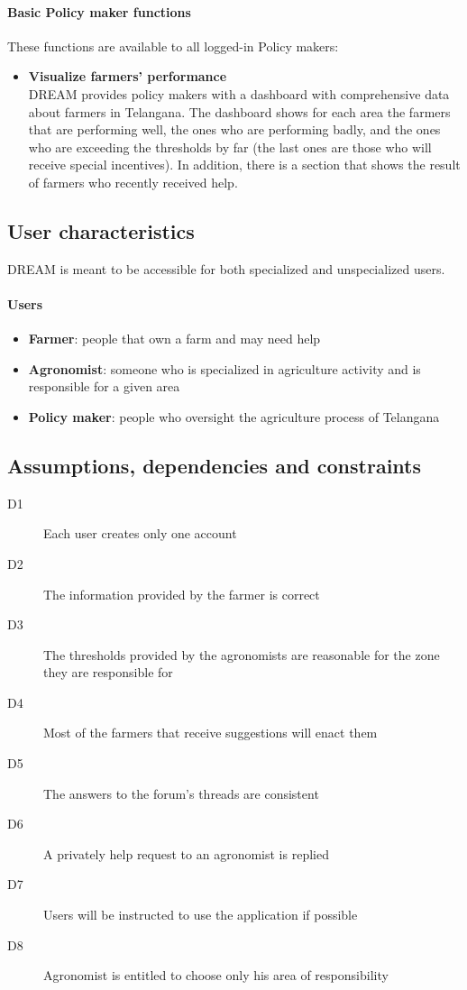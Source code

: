 \paragraph{Basic Policy maker functions} These functions are available to all logged-in Policy makers:
\begin{itemize}
    \item \textbf{Visualize farmers' performance}\\
    DREAM provides policy makers with a dashboard with comprehensive data about farmers in Telangana.
    The dashboard shows for each area the farmers that are performing well, the ones who are performing badly,
    and the ones who are exceeding the thresholds by far (the last ones are those who will receive special incentives).
    \newline In addition, there is a section that shows the result of farmers who recently received help.
\end{itemize}

\newpage
\subsection{User characteristics}

DREAM is meant to be accessible for both specialized and unspecialized users.

\paragraph{Users}
\begin{itemize}
    \item \textbf{Farmer}: people that own a farm and may need help
    \item \textbf{Agronomist}: someone who is specialized in agriculture activity and is responsible for a given area
    \item \textbf{Policy maker}: people who oversight the agriculture process of Telangana
\end{itemize}

\bigskip
\subsection{Assumptions, dependencies and constraints}
\begin{description}
    \item[D1] Each user creates only one account
    \item[D2] The information provided by the farmer is correct
    \item[D3] The thresholds provided by the agronomists are reasonable for the zone they are responsible for
    \item[D4] Most of the farmers that receive suggestions will enact them
    \item[D5] The answers to the forum's threads are consistent
    \item[D6] A privately help request to an agronomist is replied
    \item[D7] Users will be instructed to use the application if possible
    \item[D8] Agronomist is entitled to choose only his area of responsibility
\end{description}